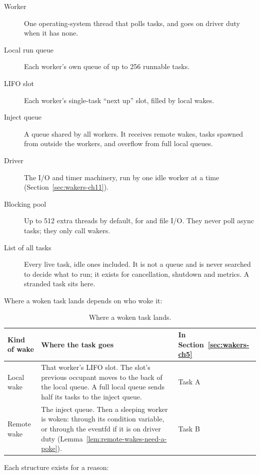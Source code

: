 \begin{description}
    \item[Worker] One operating-system thread that polls tasks, and goes on driver duty when it has none.
    \item[Local run queue] Each worker's own queue of up to 256 runnable tasks.
    \item[LIFO slot] Each worker's single-task ``next up'' slot, filled by local wakes.
    \item[Inject queue] A queue shared by all workers. It receives remote wakes, tasks spawned from outside the workers, and overflow from full local queues.
    \item[Driver] The I/O and timer machinery, run by one idle worker at a time (Section~\ref{sec:wakers-ch11}).
    \item[Blocking pool] Up to 512 extra threads by default, for  and file I/O. They never poll async tasks; they only call wakers.
    \item[List of all tasks] Every live task, idle ones included. It is not a queue and is never searched to decide what to run; it exists for cancellation, shutdown and metrics. A stranded task sits here.
\end{description}

Where a woken task lands depends on who woke it:

\begin{table}[htbp]
    \centering\small
    \begin{tabularx}{\linewidth}{>{\raggedright\arraybackslash}p{2.4cm} Y >{\raggedright\arraybackslash}p{2.6cm}}
        \toprule
        \textbf{Kind of wake} & \textbf{Where the task goes} & \textbf{In Section~\ref{sec:wakers-ch5}} \\
        \midrule
        Local wake & That worker's LIFO slot. The slot's previous occupant moves to the back of the local queue. A full local queue sends half its tasks to the inject queue. & Task A \\
        Remote wake & The inject queue. Then a sleeping worker is woken: through its condition variable, or through the eventfd if it is on driver duty (Lemma~\ref{lem:remote-wakes-need-a-poke}). & Task B \\
        \bottomrule
    \end{tabularx}
    \caption{Where a woken task lands.}
    \label{tab:wakers-10.1}
\end{table}

Each structure exists for a reason:

